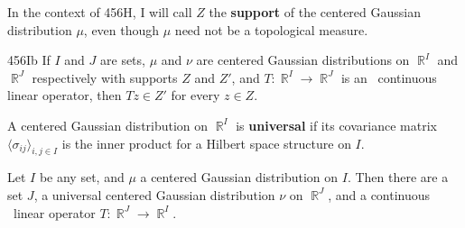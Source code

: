  In the context of 456H, I will call $Z$ the
{\bf support} of the centered Gaussian distribution $\mu$, even though
$\mu$ need not be a topological measure.

\spheader 456Ib   If
$I$ and $J$ are sets, $\mu$ and $\nu$ are centered Gaussian
distributions on $\BbbR^I$ and $\BbbR^J$ respectively with supports $Z$
and $Z'$, and $T:\BbbR^I\to\BbbR^J$ is an \imp\ continuous linear
operator, then $Tz\in Z'$ for every $z\in Z$.   

 A centered
Gaussian distribution on $\BbbR^I$ is {\bf universal} if its covariance
matrix $\langle\sigma_{ij}\rangle_{i,j\in I}$ is the inner product for a
Hilbert space structure on $I$.   

 Let $I$ be any set, and $\mu$ a centered
Gaussian distribution on $I$.   Then there are a set $J$, a universal
centered Gaussian distribution $\nu$ on $\BbbR^J$, and a continuous
\imp\ linear operator $T:\BbbR^J\to\BbbR^I$.

